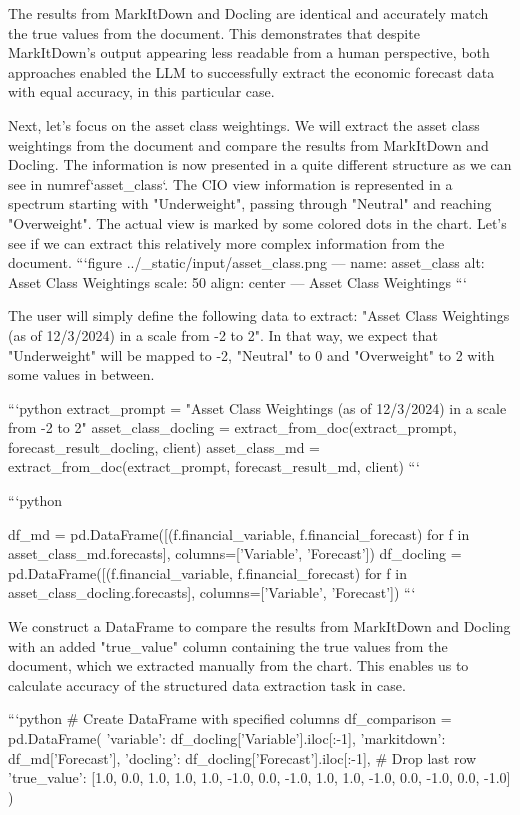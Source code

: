The results from MarkItDown and Docling are identical and accurately match the true values from the document. This demonstrates that despite MarkItDown's output appearing less readable from a human perspective, both approaches enabled the LLM to successfully extract the economic forecast data with equal accuracy, in this particular case.

Next, let's focus on the asset class weightings. We will extract the asset class weightings from the document and compare the results from MarkItDown and Docling. The information is now presented in a quite different structure as we can see in  {numref}`asset_class`. The CIO view information is represented in a spectrum starting with "Underweight", passing through "Neutral" and reaching "Overweight". The actual view is marked by some colored dots in the chart. Let's see if we can extract this relatively more complex information from the document.
```{figure} ../_static/input/asset_class.png
---
name: asset_class
alt: Asset Class Weightings
scale: 50%
align: center
---
Asset Class Weightings
```

The user will simply define the following data to extract: "Asset Class Weightings (as of 12/3/2024) in a scale from -2 to 2". In that way, we expect that "Underweight" will be mapped to -2, "Neutral" to 0 and "Overweight" to 2 with some values in between.


```python
extract_prompt = "Asset Class Weightings (as of 12/3/2024) in a scale from -2 to 2"
asset_class_docling = extract_from_doc(extract_prompt, forecast_result_docling, client)
asset_class_md = extract_from_doc(extract_prompt, forecast_result_md, client)
```


```python

df_md = pd.DataFrame([(f.financial_variable, f.financial_forecast) for f in asset_class_md.forecasts], 
                 columns=['Variable', 'Forecast'])
df_docling = pd.DataFrame([(f.financial_variable, f.financial_forecast) for f in asset_class_docling.forecasts], 
                 columns=['Variable', 'Forecast'])
```

We construct a DataFrame to compare the results from MarkItDown and Docling with an added "true_value" column containing the true values from the document, which we extracted manually from the chart. This enables us to calculate accuracy of the structured data extraction task in case.


```python
# Create DataFrame with specified columns
df_comparison = pd.DataFrame({
    'variable': df_docling['Variable'].iloc[:-1],
    'markitdown': df_md['Forecast'],
    'docling': df_docling['Forecast'].iloc[:-1],  # Drop last row
    'true_value': [1.0, 0.0, 1.0, 1.0, 1.0, -1.0, 0.0, -1.0, 1.0, 1.0, -1.0, 0.0, -1.0, 0.0, -1.0]
})

